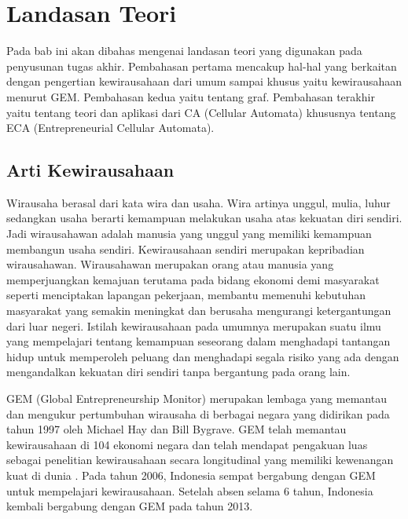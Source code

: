 \chapter{Landasan Teori}
\label{chap:teori}


 
Pada bab ini akan dibahas mengenai landasan teori yang digunakan pada penyusunan tugas akhir. Pembahasan pertama mencakup hal-hal yang berkaitan dengan pengertian kewirausahaan dari umum sampai khusus yaitu kewirausahaan menurut GEM. Pembahasan kedua yaitu tentang graf. Pembahasan terakhir yaitu tentang teori dan aplikasi dari CA (Cellular Automata) khususnya tentang ECA (Entrepreneurial Cellular Automata).


\section{Arti Kewirausahaan}
\label{sec:artiwirausaha}

\graphicspath{{images/}}

Wirausaha berasal dari kata wira dan usaha. Wira artinya unggul, mulia, luhur sedangkan usaha berarti kemampuan melakukan usaha atas kekuatan diri sendiri. Jadi wirausahawan adalah manusia yang unggul yang memiliki kemampuan membangun usaha sendiri. Kewirausahaan sendiri merupakan kepribadian wirausahawan. Wirausahawan merupakan orang atau manusia yang memperjuangkan kemajuan terutama pada bidang ekonomi demi masyarakat seperti menciptakan lapangan pekerjaan, membantu memenuhi kebutuhan masyarakat yang semakin meningkat dan berusaha mengurangi ketergantungan dari luar negeri. Istilah kewirausahaan pada umumnya merupakan suatu ilmu yang mempelajari tentang kemampuan seseorang dalam menghadapi tantangan hidup untuk memperoleh peluang dan menghadapi segala risiko yang ada dengan mengandalkan kekuatan diri sendiri tanpa bergantung pada orang lain. \cite{artiwirausaha} 


GEM (Global Entrepreneurship Monitor) merupakan lembaga yang memantau dan mengukur pertumbuhan wirausaha di berbagai negara yang didirikan pada tahun 1997 oleh Michael Hay dan Bill Bygrave. GEM telah memantau kewirausahaan di 104 ekonomi negara dan telah mendapat pengakuan luas sebagai penelitian kewirausahaan secara longitudinal yang memiliki kewenangan kuat di dunia . Pada tahun 2006, Indonesia sempat bergabung dengan GEM untuk mempelajari kewirausahaan. Setelah absen selama 6 tahun, Indonesia kembali bergabung dengan GEM pada tahun 2013.\cite{ECA}



